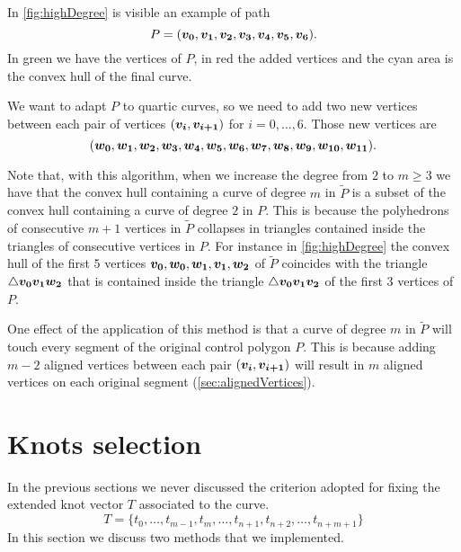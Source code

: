 \documentclass[dissertation.tex]{subfiles}
\begin{document}
In \cref{fig:highDegree} is visible an example of path
\begin{equation*}
  P=(\boldsymbol{v_0},\boldsymbol{v_1},\boldsymbol{v_2},\boldsymbol{v_3},\boldsymbol{v_4},\boldsymbol{v_5},\boldsymbol{v_6}).
\end{equation*}
In green we have the vertices of $P$, in red the added vertices and
the cyan area is the convex hull of the final curve.

We want to adapt $P$ to quartic \bs curves, so we need to add two new
vertices between each pair of vertices $(\boldsymbol{v_i},\boldsymbol{v_{i+1}})$ for
$i=0,\dots,6$. Those new vertices are
\begin{equation*}
  (\boldsymbol{w_0},\boldsymbol{w_1},\boldsymbol{w_2},\boldsymbol{w_3},\boldsymbol{w_4},\boldsymbol{w_5},\boldsymbol{w_6},\boldsymbol{w_7},\boldsymbol{w_8},\boldsymbol{w_9},\boldsymbol{w_{10}},\boldsymbol{w_{11}}).
\end{equation*}

Note that, with this algorithm, when we increase the degree from $2$
to $m\ge 3$ we have that the convex hull containing a \bs curve of
degree $m$ in
$\tilde{P}$ is a subset of the convex hull containing a \bs curve
of degree $2$
in $P$. This is because the polyhedrons of consecutive $m+1$ vertices in
$\tilde{P}$ collapses in triangles contained inside the triangles
of consecutive vertices in $P$. For instance in \cref{fig:highDegree}
the convex hull of the first $5$ vertices
$\boldsymbol{v_0},\boldsymbol{w_0},\boldsymbol{w_1},\boldsymbol{v_1},\boldsymbol{w_2}$ of $\tilde{P}$
coincides with the
triangle $\triangle \boldsymbol{v_0}\boldsymbol{v_1}\boldsymbol{w_2}$ that is contained inside
the triangle $\triangle \boldsymbol{v_0}\boldsymbol{v_1}\boldsymbol{v_2}$ of the first $3$
vertices of $P$.

One effect of the application of this method is that a curve of
degree $m$ in $\tilde{P}$ will touch
every segment of the original control polygon $P$. This is because adding
$m-2$ aligned vertices between each pair $(\boldsymbol{v_i},\boldsymbol{v_{i+1}})$
will result in $m$ aligned vertices on each original segment
(\cref{sec:alignedVertices}).

\section{Knots selection}\label{sec:knotSel}
In the previous sections we never discussed the criterion adopted for
fixing the extended knot vector $T$ associated to the \bs curve.
\begin{equation*}
  T=\{t_0,\dots,t_{m-1},t_{m},\dots,t_{n+1},t_{n+2},\dots,t_{n+m+1}\}
\end{equation*}
In this section we discuss two
methods that we implemented.
\end{document}

